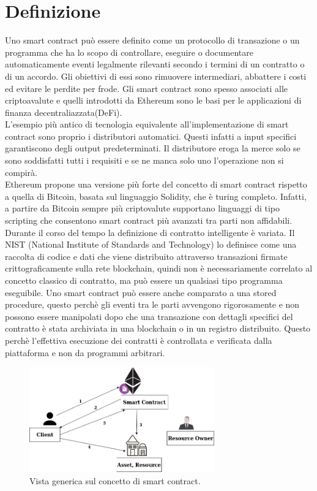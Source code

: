 \documentclass[a4paper,11pt]{report}
\begin{document}
\section{Definizione}
Uno smart contract può essere definito come un protocollo di transazione o un programma che ha lo scopo di controllare, eseguire o documentare automaticamente eventi legalmente rilevanti secondo i termini di un contratto o di un accordo. Gli obiettivi di essi sono rimuovere intermediari, abbattere i costi ed evitare le perdite per frode. Gli smart contract sono spesso associati alle criptoavalute e quelli introdotti da Ethereum sono le basi per le applicazioni di finanza decentraliazzata(DeFi).\\
L'esempio più antico di tecnologia equivalente all'implementazione di smart contract sono proprio i distributori automatici. Questi infatti a input specifici garantiscono degli output predeterminati. Il distributore eroga la merce solo se sono soddisfatti tutti i requisiti e se ne manca solo uno l'operazione non si compirà.\\
Ethereum propone una versione più forte del concetto di smart contract rispetto a quella di Bitcoin, basata sul linguaggio Solidity, che è turing completo. Infatti, a partire da Bitcoin sempre più criptovalute supportano linguaggi di tipo scripting che consentono smart contract più avanzati tra parti non affidabili.\\
Durante il  corso del tempo la definizione di contratto intelligente è variata. Il NIST (National Institute of Standards and Technology) lo definisce come una raccolta di codice e dati che viene distribuito attraverso transazioni firmate crittograficamente sulla rete blockchain, quindi non è necessariamente correlato al concetto classico di contratto, ma può essere un qualsiasi tipo programma eseguibile. Uno smart contract può essere anche comparato a una stored procedure, questo perchè gli eventi tra le parti avvengono rigorosamente e non possono essere manipolati dopo che una transazione con dettagli specifici del contratto è stata archiviata in una blockchain o in un registro distribuito. Questo perchè l'effettiva esecuzione dei contratti è controllata e verificata dalla piattaforma e non da programmi arbitrari.
\begin{figure}[htbp] 
\begin{center}
\includegraphics[width=8cm]{img/smrt.png} 
\end{center}
\caption{Vista generica sul concetto di smart contract.\cite{smartContract}}
\end{figure}
\end{document}
